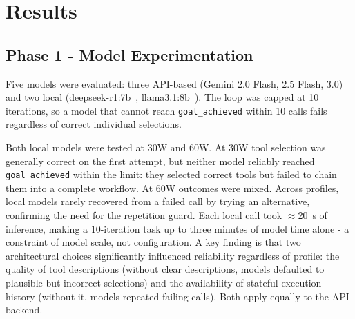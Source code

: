 \documentclass[conference]{IEEEtran}
\begin{document}
\begin{table}[t]
  \caption{MONAI segmentation inference times across hardware configurations for PANCREAS\_0001.}
  \label{tab:inference-results}
  \centering
  \small
\end{table}

\section{Results}
\label{sec:results}

\subsection{Phase 1  -  Model Experimentation}
Five models were evaluated: three API-based (Gemini 2.0 Flash, 2.5 Flash, 3.0)~\cite{gemini2025} and two local (deepseek-r1:7b~\cite{deepseekr1}, llama3.1:8b~\cite{llama31}). The loop was capped at 10 iterations, so a model that cannot reach \texttt{goal\_achieved} within 10 calls fails regardless of correct individual selections.

Both local models were tested at 30W and 60W. At 30W tool selection was generally correct on the first attempt, but neither model reliably reached \texttt{goal\_achieved} within the limit: they selected correct tools but failed to chain them into a complete workflow. At 60W outcomes were mixed. Across profiles, local models rarely recovered from a failed call by trying an alternative, confirming the need for the repetition guard. Each local call took $\approx$20~s of inference, making a 10-iteration task up to three minutes of model time alone - a constraint of model scale, not configuration. A key finding is that two architectural choices significantly influenced reliability regardless of profile: the quality of tool descriptions (without clear descriptions, models defaulted to plausible but incorrect selections) and the availability of stateful execution history (without it, models repeated failing calls). Both apply equally to the API backend.
\end{document}
